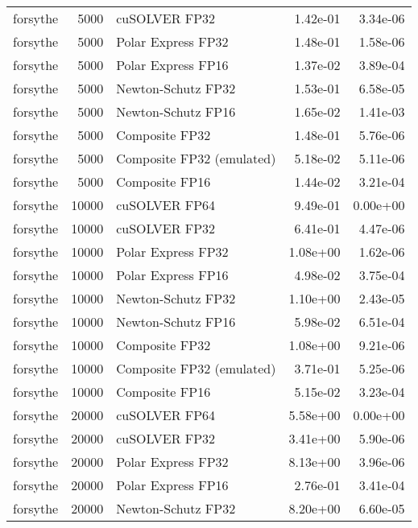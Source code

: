 \begin{table}
\begin{tabular}{lrlrr}
 forsythe &  5000 &             cuSOLVER FP32 &  1.42e-01 &        3.34e-06 \\
 forsythe &  5000 &        Polar Express FP32 &  1.48e-01 &        1.58e-06 \\
 forsythe &  5000 &        Polar Express FP16 &  1.37e-02 &        3.89e-04 \\
 forsythe &  5000 &        Newton-Schutz FP32 &  1.53e-01 &        6.58e-05 \\
 forsythe &  5000 &        Newton-Schutz FP16 &  1.65e-02 &        1.41e-03 \\
 forsythe &  5000 &            Composite FP32 &  1.48e-01 &        5.76e-06 \\
 forsythe &  5000 & Composite FP32 (emulated) &  5.18e-02 &        5.11e-06 \\
 forsythe &  5000 &            Composite FP16 &  1.44e-02 &        3.21e-04 \\
 forsythe & 10000 &             cuSOLVER FP64 &  9.49e-01 &        0.00e+00 \\
 forsythe & 10000 &             cuSOLVER FP32 &  6.41e-01 &        4.47e-06 \\
 forsythe & 10000 &        Polar Express FP32 &  1.08e+00 &        1.62e-06 \\
 forsythe & 10000 &        Polar Express FP16 &  4.98e-02 &        3.75e-04 \\
 forsythe & 10000 &        Newton-Schutz FP32 &  1.10e+00 &        2.43e-05 \\
 forsythe & 10000 &        Newton-Schutz FP16 &  5.98e-02 &        6.51e-04 \\
 forsythe & 10000 &            Composite FP32 &  1.08e+00 &        9.21e-06 \\
 forsythe & 10000 & Composite FP32 (emulated) &  3.71e-01 &        5.25e-06 \\
 forsythe & 10000 &            Composite FP16 &  5.15e-02 &        3.23e-04 \\
 forsythe & 20000 &             cuSOLVER FP64 &  5.58e+00 &        0.00e+00 \\
 forsythe & 20000 &             cuSOLVER FP32 &  3.41e+00 &        5.90e-06 \\
 forsythe & 20000 &        Polar Express FP32 &  8.13e+00 &        3.96e-06 \\
 forsythe & 20000 &        Polar Express FP16 &  2.76e-01 &        3.41e-04 \\
 forsythe & 20000 &        Newton-Schutz FP32 &  8.20e+00 &        6.60e-05 \\

\end{tabular}
\end{table}
